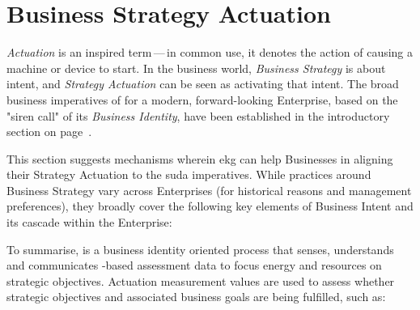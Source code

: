 \chapter{Business Strategy Actuation}
\label{ch:ekg-mm-a-1}
\label{ch:ekg-mm-business-strategy-actuation}



\textit{Actuation} is an inspired term\,---\,in common use, it denotes the action of causing a
machine or device to start.
In the business world, \textit{Business Strategy} is about intent, and \textit{Strategy Actuation}
can be seen as activating that intent.
The broad business imperatives of  for a modern, forward-looking Enterprise,
based on the "siren call" of its \textit{Business Identity},
have been established in the introductory section on page~\pageref{sec:ekg-mm-business-identity}.

This section suggests mechanisms wherein \gls{ekg} can help Businesses in aligning their Strategy Actuation to
the \gls{suda} imperatives.
While practices around Business Strategy vary across Enterprises (for historical reasons and management preferences),
they broadly cover the following key elements of Business Intent and its cascade within the Enterprise:







To summarise, \textbf{} is a business identity oriented process
that senses, understands and communicates -based assessment data to focus energy and
resources on strategic objectives.
Actuation measurement values are used to assess whether strategic objectives and associated business goals are
being fulfilled, such as:

